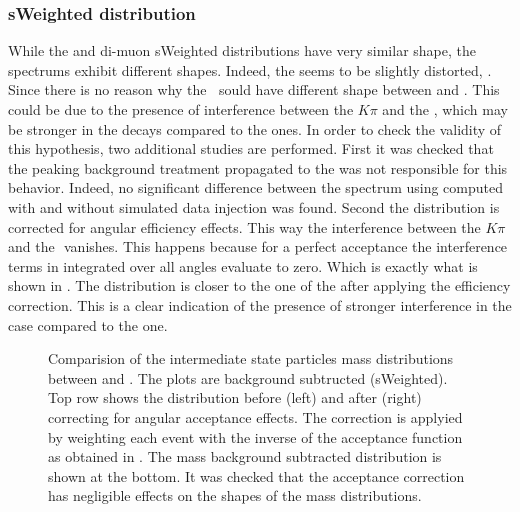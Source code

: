\subsubsection{sWeighted \mkpi distribution}
While the \Bs and \Bd di-muon sWeighted distributions have very similar shape, the \mkpi spectrums exhibit different shapes. 
Indeed, the \Bs \mkpi \sPlot seems to be slightly distorted, . Since there is no reason why the \Kst$~$\pwave 
sould have different shape between \BsJpsiKst and \BdJpsiKst. This could be due to the presence of interference between
the $K\pi$ \swave and the \Kstarz, which may be stronger in the \Bs decays compared to the \Bd ones. In order 
to check the validity of this hypothesis, two additional studies are performed. First it was checked that the peaking
background treatment propagated to the \sWeights was not responsible for this behavior. Indeed, no significant difference 
between the \Bs \mkpi spectrum using \sWeights computed with and without simulated data injection was found. Second the \mkpi 
distribution is corrected for angular efficiency effects. This way the interference between the $K\pi$ \swave and the 
\Kstarz $ $ \pwave vanishes. This happens because for a perfect acceptance the interference terms in  integrated over all angles
evaluate to zero. Which is exactly what is shown in . The \Bs \mkpi distribution is closer to the one of the \Bd after applying
the efficiency correction. This is a clear indication of the presence of stronger interference in the \Bs case compared to the \Bd one.

\begin{figure}[h]
  \centering
  \begin{subfigure}{0.5\textwidth}
    \scalebox{0.65}{}
    \caption{}
    \label{mkpiPlot_raw}
  \end{subfigure}%
  \hfill%
  \begin{subfigure}{0.5\textwidth}
    \scalebox{0.65}{}
    \caption{}
    \label{mkpiPlot_eff}
  \end{subfigure}
  \begin{subfigure}{0.5\textwidth}
    \scalebox{0.65}{}
    \caption{}
    \label{jpsiPlot}
  \end{subfigure}
\caption{Comparision of the intermediate state particles mass distributions between \Bs and \Bd.
         The plots are background subtructed (sWeighted). Top row shows the \mkpi distribution before (left)
         and after (right) correcting for angular acceptance effects. The correction is applyied by weighting
          each event with the inverse of the acceptance function as obtained in .
         The \Jpsi mass background subtracted distribution is shown at the bottom. It was checked that the 
         acceptance correction has negligible effects on the shapes of the \Jpsi mass distributions. }

\end{figure}

